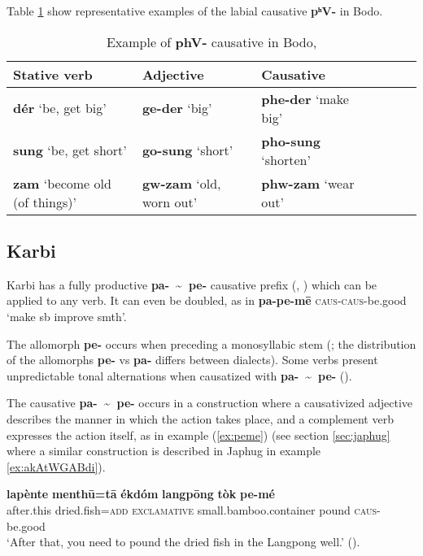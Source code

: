 \documentclass[oneside,a4paper,11pt]{article}
\newcommand{\ipa}[1]{\textbf{{\phon\mbox{#1}}}} %
\newcommand{\forme}[2]{\ipa{#1} `#2'}
\newcommand{\refb}[1]{(\ref{#1})}
\newcommand{\tld}{\textasciitilde{}}
\begin{document}
Table \ref{tab:bodo.phV} show representative examples of the labial causative  \ipa{pʰV-} in Bodo.

\begin{table}[H]
\caption{Example of \ipa{phV-} causative in Bodo, \citet[54]{delancey15adjectival}} \label{tab:bodo.phV}
\begin{tabular}{lllllll}
\toprule
Stative verb & Adjective & Causative \\
\midrule
\forme{dér}{be, get big} & \forme{ge-der}{big} & \forme{phe-der}{make big} \\
\forme{sung}{be, get short} & \forme{go-sung}{short} & \forme{pho-sung}{shorten} \\
\forme{zam}{become old (of things)} & \forme{gw-zam}{old, worn out} & \forme{phw-zam}{wear out} \\
\bottomrule
\end{tabular}
\end{table}

\subsection{Karbi} \label{sec:karbi}
Karbi has a fully productive \ipa{pa- \tld{} pe-} causative prefix (\citealt[93-4]{gruessner78mikir}, \citealt[238-9]{konnerth14karbi}) which can be applied to any verb. It can even be doubled, as in \ipa{pa-pe-mē} \textsc{caus-caus}-be.good `make sb improve smth'. 

The allomorph \ipa{pe-} occurs when preceding a monosyllabic stem (\citealt[105]{konnerth14karbi}; the distribution of the allomorphs \ipa{pe-} vs \ipa{pa-} differs between dialects). Some verbs present unpredictable tonal alternations when causatized with \ipa{pa- \tld{} pe-} (\citealt[103]{konnerth14karbi}). 

The causative \ipa{pa- \tld{} pe-} occurs in a construction where a causativized adjective describes the manner in which the action takes place, and a complement verb expresses the action itself, as in example \refb{ex:peme} (see section \ref{sec:japhug} where a similar construction is described in Japhug in example \ref{ex:akAtWGABdi}).

\begin{exe}
\ex \label{ex:peme}
\gll 
\ipa{lapènte} 	\ipa{menthū=tā} 	\ipa{ékdóm} 	\ipa{langpōng} 	\ipa{tòk} 	\ipa{pe-mé} \\
after.this dried.fish=\textsc{add} \textsc{exclamative} small.bamboo.container pound \textsc{caus}-be.good\\
\glt `After that, you need to pound the dried fish in the Langpong well.' (\citealt[124]{konnerth14karbi}).
\end{exe}
\end{document}
